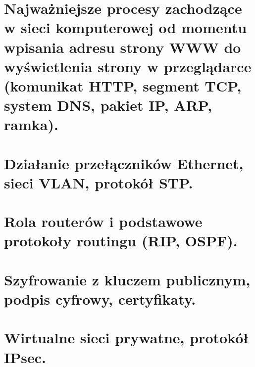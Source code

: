 \documentclass[12pt]{article}
\begin{document}
    \section{Najważniejsze procesy zachodzące w sieci komputerowej od momentu wpisania adresu strony WWW do wyświetlenia strony w przeglądarce (komunikat HTTP, segment TCP, system DNS, pakiet IP, ARP, ramka).}
    \section{Działanie przełączników Ethernet, sieci VLAN, protokół STP.}
    \section{Rola routerów i podstawowe protokoły routingu (RIP, OSPF).}
    \section{Szyfrowanie z kluczem publicznym, podpis cyfrowy, certyfikaty.}
    \section{Wirtualne sieci prywatne, protokół IPsec.}
\end{document}
